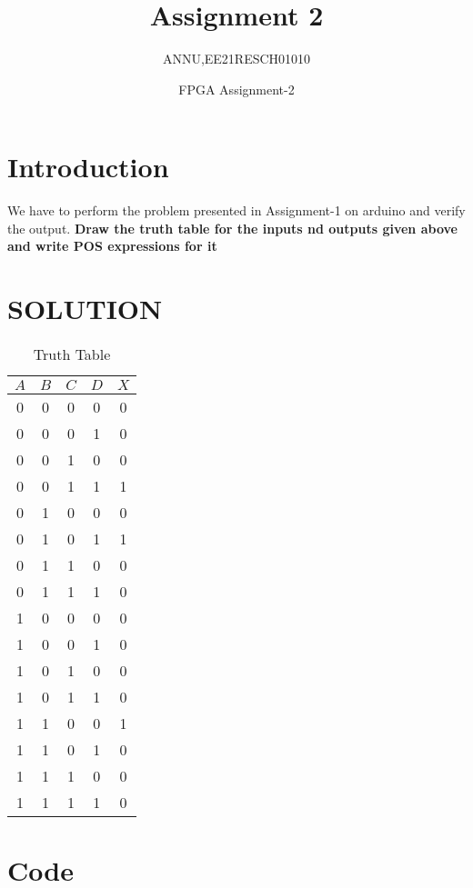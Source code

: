 \documentclass{article}
\title{Assignment 2}
\author{ANNU,EE21RESCH01010}
\date{FPGA Assignment-2}
\begin{document}
\maketitle

\section{Introduction}

We have to perform the problem presented in Assignment-1 on arduino and verify the output.
\textbf{Draw the truth table for the inputs nd outputs given above and write POS expressions for it}
\section{SOLUTION}

\begin{table}[h] 
    \centering
    \begin{tabular}{|c|c|c|c|c|}
    \hline
    $A$&$B$&$C$&$D$&$X$  \\
    \hline
    0&0&0&0&0\\
    0&0&0&1&0\\
    0&0&1&0&0\\
    0&0&1&1&1\\
    0&1&0&0&0\\
    0&1&0&1&1\\
    0&1&1&0&0\\
    0&1&1&1&0\\
    1&0&0&0&0\\
    1&0&0&1&0\\
    1&0&1&0&0\\
    1&0&1&1&0\\
    1&1&0&0&1\\
    1&1&0&1&0\\
    1&1&1&0&0\\
    1&1&1&1&0\\
    \hline
    \end{tabular}
    \caption{Truth Table}
    \label{table:tt}
\end{table}



\newpage

\section{Code}
\end{document}
